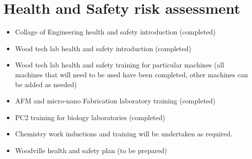 \section{Health and Safety risk assessment}
\begin{itemize}
\item Collage of Engineering health and safety introduction (completed)
\end{itemize}

\begin{itemize}
\item Wood tech lab health and safety introduction (completed)
\end{itemize}

\begin{itemize}
\item Wood tech lab health and safety training for particular machines (all machines
that will need to be used have been completed, other machines can be added as
needed)
\end{itemize}

\begin{itemize}
\item AFM and micro-nano Fabrication laboratory training (completed)
\end{itemize}

\begin{itemize}
\item  PC2 training for biology laboratories (completed)
\end{itemize}

\begin{itemize}
\item Chemistry work inductions and training will be undertaken as required.
\end{itemize}
\begin{itemize}
\item Woodville health and safety plan (to be prepared)
\end{itemize}

  
  